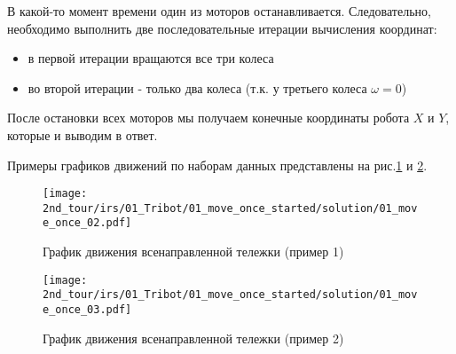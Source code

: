 В какой-то момент времени один из моторов останавливается. Следовательно, необходимо выполнить две последовательные итерации вычисления координат: 
\begin{itemize}
	\item в первой итерации вращаются все три колеса
	\item во второй итерации - только два колеса (т.к. у третьего колеса $\omega = 0$)
\end{itemize}

После остановки всех моторов мы получаем конечные координаты робота $X$ и $Y$, которые и выводим в ответ.

Примеры графиков движений по наборам данных представлены на рис.\ref{fig:01_move_once_02} и \ref{fig:01_move_once_03}.

\begin{figure}[H]
	\centering
	\texttt{[image: 2nd\_tour/irs/01\_Tribot/01\_move\_once\_started/solution/01\_move\_once\_02.pdf]}
	\caption{График движения всенаправленной тележки (пример 1)}
	\label{fig:01_move_once_02}
\end{figure}
\begin{figure}[H]
	\centering
	\texttt{[image: 2nd\_tour/irs/01\_Tribot/01\_move\_once\_started/solution/01\_move\_once\_03.pdf]}
	\caption{График движения всенаправленной тележки (пример 2)}
	\label{fig:01_move_once_03}
\end{figure}


\codeExample

{}